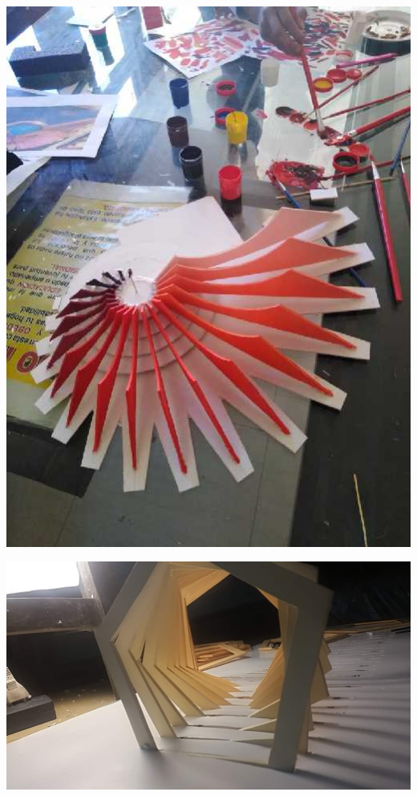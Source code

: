 \documentclass[12pt,]{report}
\begin{document}
\includegraphics{y3.jpg}

\includegraphics{1x.jpg}
\end{document}
